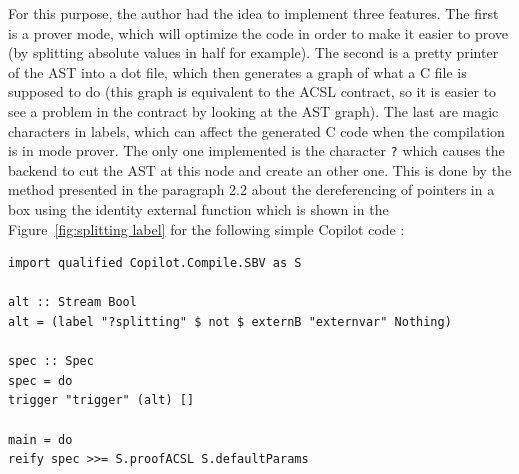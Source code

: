 \documentclass[a4paper,11pt,final]{article}
\begin{document}
	For this purpose, the author had the idea to implement three features. The first is a prover mode, which will optimize the code in order to make it easier to prove (by splitting absolute values in half for example). The second is a pretty printer of the AST into a dot file, which then generates a graph of what a C file is supposed to do (this graph is equivalent to the ACSL contract, so it is easier to see a problem in the contract by looking at the AST graph). The last are magic characters in labels, which can affect the generated C code when the compilation is in mode prover. The only one implemented is the character \texttt{?} which causes the backend to cut the AST at this node and create an other one. This is done by the method presented in the paragraph 2.2 about the dereferencing of pointers in a box using the identity external function which is shown in the Figure~\ref{fig:splitting label} for the following simple Copilot code :
\begin{verbatim}
import qualified Copilot.Compile.SBV as S

alt :: Stream Bool
alt = (label "?splitting" $ not $ externB "externvar" Nothing)

spec :: Spec
spec = do
trigger "trigger" (alt) []
	
main = do
reify spec >>= S.proofACSL S.defaultParams
\end{verbatim}
\end{document}
